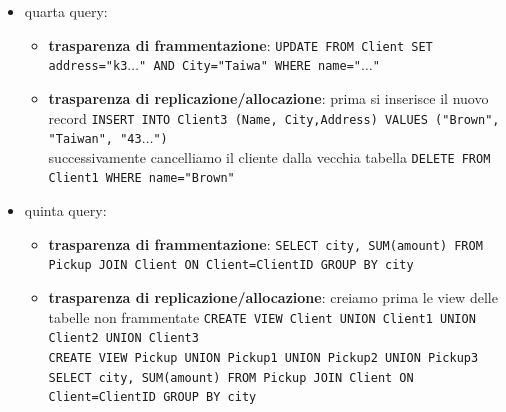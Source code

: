 \begin{esempio} 
\begin{itemize}
\begin{itemize}
                  \item \textbf{trasparenza di replicazione/allocazione}:  \texttt{SELECT machine FROM Produciton2 as P JOIN Pickup2 as PU ON P.SN = PU.SN JOIN Client2 ON Client.id=client WHERE S.Name = "Brown" AND parttype="Keyboard"}
                  \item \textbf{trasparenza di linguaggio}:  \texttt{SELECT machine FROM Produciton2@company.com as P JOIN Pickup2@company.com as PU ON P.SN = PU.SN JOIN Client2@company.com ON Client.id=client WHERE S.Name = "Brown" AND parttype="Keyboard"}
            \end{itemize}
            \item quarta query:
            \begin{itemize}
                  \item \textbf{trasparenza di frammentazione}:  \texttt{UPDATE FROM Client SET address="k3$\dots$" AND City="Taiwa" WHERE name="$\dots$"}
                  \item \textbf{trasparenza di replicazione/allocazione}:  prima si inserisce il nuovo record
                  \texttt{INSERT INTO Client3 (Name, City,Address) VALUES ("Brown", "Taiwan", "43$\dots$")}\\ successivamente cancelliamo il cliente dalla vecchia tabella
                  \texttt{DELETE FROM Client1 WHERE name="Brown"}
            \end{itemize}
            \item quinta query:
            \begin{itemize}
                  \item \textbf{trasparenza di frammentazione}:  \texttt{SELECT city, SUM(amount) FROM Pickup JOIN Client ON Client=ClientID GROUP BY city}
                  \item \textbf{trasparenza di replicazione/allocazione}: creiamo prima
                  le view delle tabelle non frammentate
                  \texttt{CREATE VIEW Client UNION Client1 UNION Client2 UNION Client3} \\
                  \texttt{CREATE VIEW Pickup UNION Pickup1 UNION Pickup2 UNION Pickup3} \\ 
                  \texttt{SELECT city, SUM(amount) FROM Pickup JOIN Client ON Client=ClientID GROUP BY city}
            \end{itemize}
      \end{itemize}
\end{esempio}
